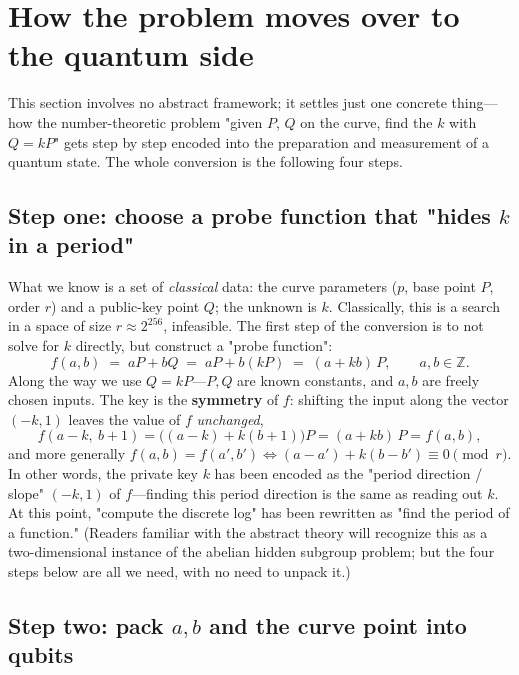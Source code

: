 \documentclass[11pt]{article}
\begin{document}
\section{How the problem moves over to the quantum side}
\label{sec:reduce}

This section involves no abstract framework; it settles just one concrete thing---how the number-theoretic problem "given $P$, $Q$ on the curve, find the $k$ with $Q=kP$" gets step by step
encoded into the preparation and measurement of a quantum state. The whole conversion is the following four steps.

\subsection{Step one: choose a probe function that "hides $k$ in a period"}

What we know is a set of \emph{classical} data: the curve parameters ($p$, base point $P$, order $r$) and a public-key point $Q$; the unknown is $k$. Classically, this is a search in a space of size
$r\approx2^{256}$, infeasible. The first step of the conversion is to not solve for $k$ directly, but construct a "probe function":
\begin{equation}
f(a,b)\;=\;aP+bQ\;=\;aP+b(kP)\;=\;(a+kb)\,P,\qquad a,b\in\mathbb{Z} .
\label{eq:f}
\end{equation}
Along the way we use $Q=kP$---$P,Q$ are known constants, and $a,b$ are freely chosen inputs. The key is the \textbf{symmetry} of $f$: shifting the input along the vector
$(-k,1)$ leaves the value of $f$ \emph{unchanged},
\begin{equation}
f(a-k,\ b+1)=\bigl((a-k)+k(b+1)\bigr)P=(a+kb)\,P=f(a,b),
\label{eq:period}
\end{equation}
and more generally $f(a,b)=f(a',b')\iff (a-a')+k(b-b')\equiv0\pmod r$. In other words, the private key $k$ has been encoded as the
"period direction / slope" $(-k,1)$ of $f$---finding this period direction is the same as reading out $k$. At this point, "compute the discrete log" has been rewritten as "find the
period of a function." (Readers familiar with the abstract theory will recognize this as a two-dimensional instance of the abelian hidden subgroup problem; but the four steps below are all we need, with no need to unpack it.)

\subsection{Step two: pack $a,b$ and the curve point into qubits}
\end{document}
